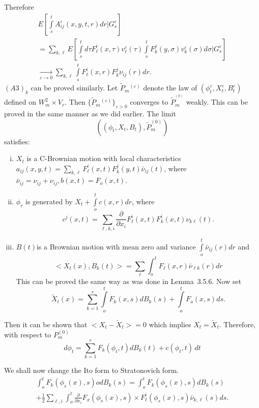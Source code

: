 Therefore
\begin{multline*}
  E \left[\int\limits_s^t A_{ij}^\varepsilon (x,y,t,r) dr |
    G^\varepsilon_s\right]\\ 
  = \sum_{k, \ell} E \left[\int\limits_s^t d \tau F^i_\ell ( x,\tau ) v
    ^\varepsilon_\ell (\tau) \int\limits_s^t F^j_k (y, \sigma)
    v^\varepsilon_k (\sigma) d \sigma | G^\varepsilon_s\right]\\ 
   \xrightarrow[\varepsilon \to 0]{} \sum_{k, \ell} \int\limits_s^t
  F^i_\ell (x,r) F^j_k \nu_{ij}( r ) dr. 
\end{multline*}
$(A3)_k$ can be proved similarly. Let $\tilde{P}_m{^{(\varepsilon)}}$
denote the law of $(\phi^\varepsilon_t, X^\varepsilon_t,
B_t^\varepsilon)$ defined on $W^2_m \times V_r$. Then
$\{\tilde{P}_m{^{(\varepsilon)}}\}_{\varepsilon > 0}$ converges to
$\tilde{P}_m^{^{(0)}}$ weakly. This can be  proved in the same manner
as we did earlier. The limit 
$$((\phi_t, X_t,B_t), \tilde{P}_m^{(0)})$$
satisfies: 
\begin{enumerate}[(i)]
\item $X_t$ is a C-Brownian motion with local characteristics
  $a_{ij}(x,y,t)= \sum\limits_{k, \ell} F^i_\ell (x,t) F^j_k (y,t)
  \bar{\nu}_{ij}(t)$, where $\bar{\nu}_{ij} = \nu_{ij} + \nu_{ij}, b
  (x,t) = F_o (x,t)$. 

\item $\phi_r$ is generated by $X_t + \int\limits_o^t c (x,r) dr$, where
  $$
  c^j (x,t) = \sum_{\ell,k,i} \frac{\partial}{\partial x_i} F^i_\ell
  (x,t) F^i_k (x,t) \nu_{k \ell} (t). 
  $$

\item $B(t)$\pageoriginale is a Brownian motion with mean zero and variance
  $\int\limits_o^t \bar{\nu}_{ij} (r)dr$ and  
  $$
  < X_t (x), B_k (t) >  = \sum_\ell \int_o^t F_\ell (x,r) \bar{\nu}_{\ell k} (r) dr
  $$
  This can be proved the same way as was done in Lemma~3.5.6. Now set
  $$
  \tilde{X}_t (x) = \sum_{k=1}^r \int\limits_o^t F_k (x,s) d B_k (s) +
  \int\limits_o^t F_o(x,s) ds. 
  $$
\end{enumerate}

Then it can be shown that $ < X_t - \tilde{X}_t> = 0$ which implies $X_t =
\tilde{X}_t$. Therefore, with respect to $P_m^{(0)}$ 
\begin{equation*}
  d \phi_t = \sum_{k=1}^r F_k (\phi_t,t) d B_k (t) 
+ c(\phi_t,t) \, dt \tag{3.8.4}\label{c3:eq3.8.4}
\end{equation*}

We shall now change the Ito form to Stratonovich form.
\begin{multline*}
  \int_o^t F_k (\phi_s ( x ),s) o dB_k (s) = \int_o^t  F_k (\phi_s ( x
  ),s)  dB_k (s)\\ 
  +\frac{1}{2} \sum_{\ell,i} \int_o^t
  \frac{\partial}{\partial x_i} F_x (\phi_s (x),s) \times  F^i_\ell (\phi_s
  (x), s) \bar{\nu}_{k,\ell}(s) ds. \tag{3.8.5}\label{c3:eq3.8.5} 
\end{multline*}

